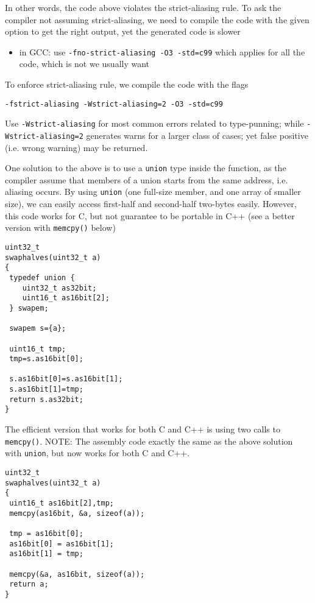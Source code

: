 In other words, the code above violates the strict-aliasing rule. To ask
the compiler not assuming strict-aliasing, we need to compile the code with the
given option to get the right output, yet the generated code is slower
\begin{itemize}
  \item in GCC: use \verb!-fno-strict-aliasing -O3 -std=c99! which applies for
  all the code, which is not we usually want
\end{itemize}
To enforce strict-aliasing rule, we compile the code with the flags
\begin{verbatim}
-fstrict-aliasing -Wstrict-aliasing=2 -O3 -std=c99 
\end{verbatim}
Use \verb!-Wstrict-aliasing! for most common errors related to type-punning;
while \verb!-Wstrict-aliasing=2! generates warns for a larger class of cases;
yet false positive (i.e. wrong warning) may be returned.

One solution to the above is to use a \verb!union! type inside the function, as
the compiler assume that members of a union starts from the same address, i.e.
aliasing occurs. By using \verb!union! (one full-size member, and one array of
smaller size), we can easily access first-half and second-half two-bytes easily.
However, this code works for C, but not guarantee to be portable in C++ (see a
better version with \verb!memcpy()! below)
\begin{Verbatim}
uint32_t
swaphalves(uint32_t a)
{
 typedef union { 
    uint32_t as32bit; 
    uint16_t as16bit[2]; 
 } swapem;
 
 swapem s={a};
 
 uint16_t tmp;
 tmp=s.as16bit[0];
 
 s.as16bit[0]=s.as16bit[1];
 s.as16bit[1]=tmp;
 return s.as32bit;
}
\end{Verbatim}

The efficient version that works for both C and C++ is using two
calls to \verb!memcpy()!. NOTE: The assembly code exactly the same as the above
solution with \verb!union!, but now works for both C and C++.
\begin{Verbatim}
uint32_t
swaphalves(uint32_t a)
{
 uint16_t as16bit[2],tmp;
 memcpy(as16bit, &a, sizeof(a));
 
 tmp = as16bit[0];
 as16bit[0] = as16bit[1];
 as16bit[1] = tmp;
 
 memcpy(&a, as16bit, sizeof(a));
 return a;
}

\end{Verbatim}

